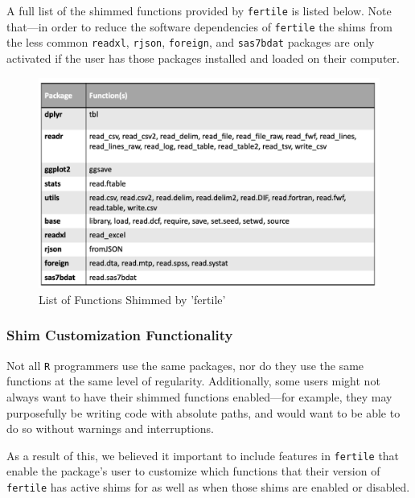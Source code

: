 \documentclass[12pt,twoside]{reedthesis}
\begin{document}
A full list of the shimmed functions provided by \texttt{fertile} is listed below. Note that---in order to reduce the software dependencies of \texttt{fertile} the shims from the less common \texttt{readxl}, \texttt{rjson}, \texttt{foreign}, and \texttt{sas7bdat} packages are only activated if the user has those packages installed and loaded on their computer.
\begin{figure}
\includegraphics[width=1\linewidth]{figure/shims-list} \caption{List of Functions Shimmed by 'fertile'}\label{fig:unnamed-chunk-52}
\end{figure}
\hypertarget{shim-customization-functionality}{%
\subsubsection{Shim Customization Functionality}\label{shim-customization-functionality}}

Not all \texttt{R} programmers use the same packages, nor do they use the same functions at the same level of regularity. Additionally, some users might not always want to have their shimmed functions enabled---for example, they may purposefully be writing code with absolute paths, and would want to be able to do so without warnings and interruptions.

As a result of this, we believed it important to include features in \texttt{fertile} that enable the package's user to customize which functions that their version of \texttt{fertile} has active shims for as well as when those shims are enabled or disabled.
\end{document}

